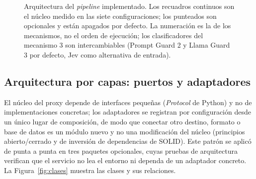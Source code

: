 \documentclass[11pt,letterpaper]{article}
\begin{document}
\begin{figure}[ht]
\caption{Arquitectura del \emph{pipeline} implementado. Los recuadros continuos son el núcleo medido en las siete configuraciones; los punteados son opcionales y están apagados por defecto. La numeración es la de los mecanismos, no el orden de ejecución; los clasificadores del mecanismo 3 son intercambiables (Prompt Guard 2 y Llama Guard 3 por defecto, Jev como alternativa de entrada).}
\label{fig:pipeline}
\end{figure}

\subsection{Arquitectura por capas: puertos y adaptadores}
\label{sec:clases}

El núcleo del proxy depende de interfaces pequeñas (\emph{Protocol} de Python) y no de implementaciones concretas; los adaptadores se registran por configuración desde un único lugar de composición, de modo que conectar otro destino, formato o base de datos es un módulo nuevo y no una modificación del núcleo (principios abierto/cerrado y de inversión de dependencias de SOLID). Este patrón se aplicó de punta a punta en tres paquetes opcionales, cuyas pruebas de arquitectura verifican que el servicio no lea el entorno ni dependa de un adaptador concreto. La Figura~\ref{fig:clases} muestra las clases y sus relaciones.
\end{document}
